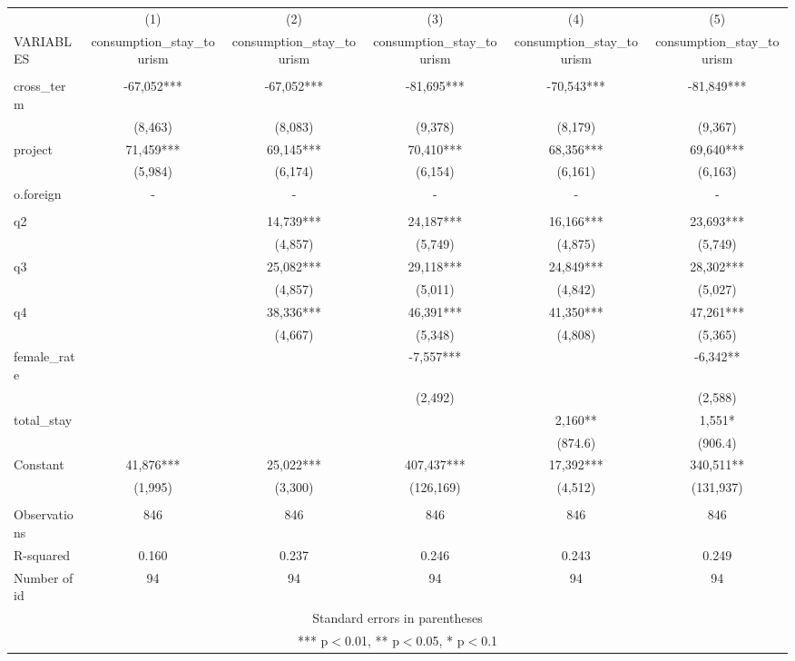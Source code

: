 \documentclass[]{article}
\begin{document}
\begin{tabular}{lccccc} \hline
 & (1) & (2) & (3) & (4) & (5) \\
VARIABLES & consumption\_stay\_tourism & consumption\_stay\_tourism & consumption\_stay\_tourism & consumption\_stay\_tourism & consumption\_stay\_tourism \\ \hline
 &  &  &  &  &  \\
cross\_term & -67,052*** & -67,052*** & -81,695*** & -70,543*** & -81,849*** \\
 & (8,463) & (8,083) & (9,378) & (8,179) & (9,367) \\
project & 71,459*** & 69,145*** & 70,410*** & 68,356*** & 69,640*** \\
 & (5,984) & (6,174) & (6,154) & (6,161) & (6,163) \\
o.foreign & - & - & - & - & - \\
 &  &  &  &  &  \\
q2 &  & 14,739*** & 24,187*** & 16,166*** & 23,693*** \\
 &  & (4,857) & (5,749) & (4,875) & (5,749) \\
q3 &  & 25,082*** & 29,118*** & 24,849*** & 28,302*** \\
 &  & (4,857) & (5,011) & (4,842) & (5,027) \\
q4 &  & 38,336*** & 46,391*** & 41,350*** & 47,261*** \\
 &  & (4,667) & (5,348) & (4,808) & (5,365) \\
female\_rate &  &  & -7,557*** &  & -6,342** \\
 &  &  & (2,492) &  & (2,588) \\
total\_stay &  &  &  & 2,160** & 1,551* \\
 &  &  &  & (874.6) & (906.4) \\
Constant & 41,876*** & 25,022*** & 407,437*** & 17,392*** & 340,511** \\
 & (1,995) & (3,300) & (126,169) & (4,512) & (131,937) \\
 &  &  &  &  &  \\
Observations & 846 & 846 & 846 & 846 & 846 \\
R-squared & 0.160 & 0.237 & 0.246 & 0.243 & 0.249 \\
 Number of id & 94 & 94 & 94 & 94 & 94 \\ \hline
\multicolumn{6}{c}{ Standard errors in parentheses} \\
\multicolumn{6}{c}{ *** p$<$0.01, ** p$<$0.05, * p$<$0.1} \\
\end{tabular}
\end{document}
